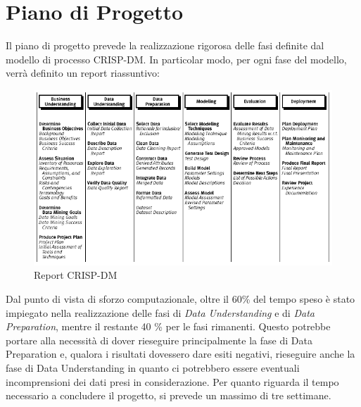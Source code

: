 \section{Piano di Progetto}
Il piano di progetto prevede la realizzazione rigorosa delle fasi definite dal modello di processo CRISP-DM.
In particolar modo, per ogni fase del modello, verrà definito un report riassuntivo: 
\begin{figure}[hbtp]
	\centering
	\includegraphics[width=1\textwidth]{./images/Metodologia_CRISP_DM.png}
	\caption{Report CRISP-DM}
	\label{Report_CRISPDM}
\end{figure}
Dal punto di vista di sforzo computazionale, oltre il 60\% del tempo speso è stato impiegato nella realizzazione delle fasi di \emph{Data Understanding} e di \emph{Data Preparation}, mentre il restante 40 \% per le fasi rimanenti.
Questo potrebbe portare alla necessità di dover rieseguire principalmente la fase di Data Preparation e, qualora i risultati dovessero dare esiti negativi, rieseguire anche la fase di Data Understanding in quanto ci potrebbero essere eventuali incomprensioni dei dati presi in considerazione.
Per quanto riguarda il tempo necessario a concludere il progetto, si prevede un massimo di tre settimane.